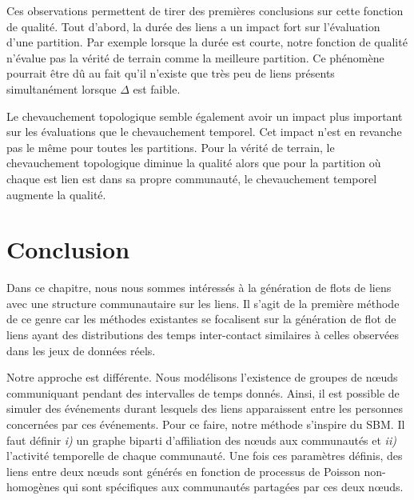Ces observations permettent de tirer des premières conclusions sur cette fonction de qualité.
Tout d'abord, la durée des liens a un impact fort sur l'évaluation d'une partition.
Par exemple lorsque la durée est courte, notre fonction de qualité n'évalue pas la vérité de terrain comme la meilleure partition.
Ce phénomène pourrait être dû au fait qu'il n'existe que très peu de liens présents simultanément lorsque $\Delta$ est faible.

Le chevauchement topologique semble également avoir un impact plus important sur les évaluations que le chevauchement temporel.
Cet impact n'est en revanche pas le même pour toutes les partitions.
Pour la vérité de terrain, le chevauchement topologique diminue la qualité alors que pour la partition où chaque est lien est dans sa propre communauté, le chevauchement temporel augmente la qualité.


\section{Conclusion}

Dans ce chapitre, nous nous sommes intéressés à la génération de flots de liens avec une structure communautaire sur les liens.
Il s'agit de la première méthode de ce genre car les méthodes existantes se focalisent sur la génération de flot de liens ayant des distributions des temps inter-contact similaires à celles observées dans les jeux de données réels.

\bigskip

Notre approche est différente.
Nous modélisons l'existence de groupes de n\oe{}uds communiquant pendant des intervalles de temps donnés.
Ainsi, il est possible de simuler des événements durant lesquels des liens apparaissent entre les personnes concernées par ces événements.
Pour ce faire, notre méthode s'inspire du SBM.
Il faut définir \emph{i)} un graphe biparti d'affiliation des n\oe{}uds aux communautés et \emph{ii)} l'activité temporelle de chaque communauté.
Une fois ces paramètres définis, des liens entre deux n\oe{}uds sont générés en fonction de processus de Poisson non-homogènes qui sont spécifiques aux communautés partagées par ces deux n\oe{}uds.


